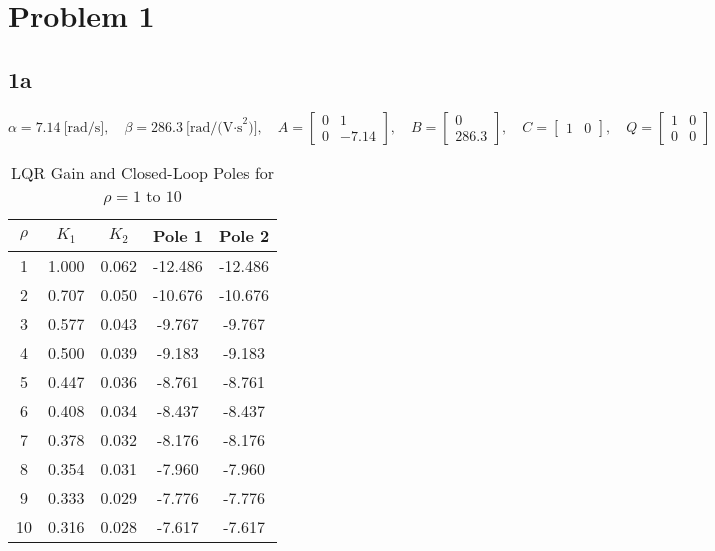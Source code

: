 \documentclass{article}
\begin{document}
\section*{Problem 1}
\subsection*{1a }
\[
\alpha = 7.14\ \text{[rad/s]},\quad \beta = 286.3\ \text{[rad/(V·s}^2\text{)]},\quad A = \begin{bmatrix} 0 & 1 \\ 0 & -7.14 \end{bmatrix},\quad B = \begin{bmatrix} 0 \\ 286.3 \end{bmatrix},\quad C = \begin{bmatrix} 1 & 0 \end{bmatrix},\quad Q = \begin{bmatrix} 1 & 0 \\ 0 & 0 \end{bmatrix}
\]


\begin{table}[h!]
\centering
\caption{LQR Gain and Closed-Loop Poles for $\rho = 1$ to $10$}
\label{tab:lqr_gains}
\begin{tabular}{c|cc|cc}
\toprule
$\rho$ & $K_1$ & $K_2$ & Pole 1 & Pole 2 \\
\midrule
1  & 1.000 & 0.062 & -12.486 & -12.486 \\
2  & 0.707 & 0.050 & -10.676 & -10.676 \\
3  & 0.577 & 0.043 & -9.767  & -9.767  \\
4  & 0.500 & 0.039 & -9.183  & -9.183  \\
5  & 0.447 & 0.036 & -8.761  & -8.761  \\
6  & 0.408 & 0.034 & -8.437  & -8.437  \\
7  & 0.378 & 0.032 & -8.176  & -8.176  \\
8  & 0.354 & 0.031 & -7.960  & -7.960  \\
9  & 0.333 & 0.029 & -7.776  & -7.776  \\
10 & 0.316 & 0.028 & -7.617  & -7.617  \\
\bottomrule
\end{tabular}
\end{table}
\end{document}
